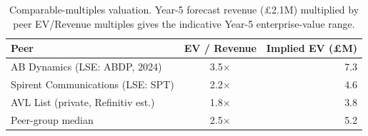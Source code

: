 \begin{table}[H]
\centering
\small
\caption{Comparable-multiples valuation. Year-5 forecast revenue 
(\pounds2.1M) multiplied by peer EV/Revenue multiples 
gives the indicative Year-5 enterprise-value range.}
\label{tab:valuation}
\begin{tabular}{lcr}
\toprule
\textbf{Peer} & \textbf{EV / Revenue} & \textbf{Implied EV (\pounds M)} \\
\midrule
AB Dynamics (LSE: ABDP, 2024) & 3.5$\times$ & 7.3 \\
Spirent Communications (LSE: SPT) & 2.2$\times$ & 4.6 \\
AVL List (private, Refinitiv est.) & 1.8$\times$ & 3.8 \\
Peer-group median & 2.5$\times$ & 5.2 \\
\bottomrule
\end{tabular}
\end{table}
